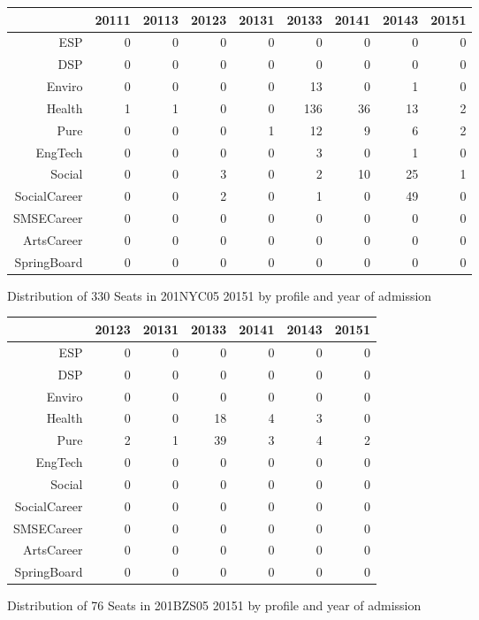 \documentclass{article}\usepackage[]{graphicx}\usepackage[]{color}
\begin{document}
\begin{figure}[H]
\centering
\begin{tabular}{rrrrrrrrr}
  \hline
 & 20111 & 20113 & 20123 & 20131 & 20133 & 20141 & 20143 & 20151 \\ 
  \hline
ESP &   0 &   0 &   0 &   0 &   0 &   0 &   0 &   0 \\ 
  DSP &   0 &   0 &   0 &   0 &   0 &   0 &   0 &   0 \\ 
  Enviro &   0 &   0 &   0 &   0 &  13 &   0 &   1 &   0 \\ 
  Health &   1 &   1 &   0 &   0 & 136 &  36 &  13 &   2 \\ 
  Pure &   0 &   0 &   0 &   1 &  12 &   9 &   6 &   2 \\ 
  EngTech &   0 &   0 &   0 &   0 &   3 &   0 &   1 &   0 \\ 
  Social &   0 &   0 &   3 &   0 &   2 &  10 &  25 &   1 \\ 
  SocialCareer &   0 &   0 &   2 &   0 &   1 &   0 &  49 &   0 \\ 
  SMSECareer &   0 &   0 &   0 &   0 &   0 &   0 &   0 &   0 \\ 
  ArtsCareer &   0 &   0 &   0 &   0 &   0 &   0 &   0 &   0 \\ 
  SpringBoard &   0 &   0 &   0 &   0 &   0 &   0 &   0 &   0 \\ 
   \hline
\end{tabular}
\caption{Distribution of 330 Seats in 201NYC05 20151 by profile and year of admission} 
\end{figure}
\begin{figure}[H]
\centering
\begin{tabular}{rrrrrrr}
  \hline
 & 20123 & 20131 & 20133 & 20141 & 20143 & 20151 \\ 
  \hline
ESP &   0 &   0 &   0 &   0 &   0 &   0 \\ 
  DSP &   0 &   0 &   0 &   0 &   0 &   0 \\ 
  Enviro &   0 &   0 &   0 &   0 &   0 &   0 \\ 
  Health &   0 &   0 &  18 &   4 &   3 &   0 \\ 
  Pure &   2 &   1 &  39 &   3 &   4 &   2 \\ 
  EngTech &   0 &   0 &   0 &   0 &   0 &   0 \\ 
  Social &   0 &   0 &   0 &   0 &   0 &   0 \\ 
  SocialCareer &   0 &   0 &   0 &   0 &   0 &   0 \\ 
  SMSECareer &   0 &   0 &   0 &   0 &   0 &   0 \\ 
  ArtsCareer &   0 &   0 &   0 &   0 &   0 &   0 \\ 
  SpringBoard &   0 &   0 &   0 &   0 &   0 &   0 \\ 
   \hline
\end{tabular}
\caption{Distribution of 76 Seats in 201BZS05 20151 by profile and year of admission} 
\end{figure}
\end{document}
